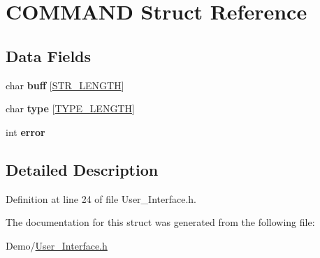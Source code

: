 \hypertarget{struct_c_o_m_m_a_n_d}{}\section{C\+O\+M\+M\+A\+ND Struct Reference}
\label{struct_c_o_m_m_a_n_d}
\subsection*{Data Fields}
\begin{DoxyCompactItemize}
\item 
\mbox{\label{struct_c_o_m_m_a_n_d_a3ca56d05670fa13929584cd8aebae252}} 
char {\bfseries buff} \mbox{[}\hyperlink{_a_p_i___i_o_8h_a9e8aaf9c28f704136d8fc1ba043b6bf5}{S\+T\+R\+\_\+\+L\+E\+N\+G\+TH}\mbox{]}
\item 
\mbox{\label{struct_c_o_m_m_a_n_d_a106c2825d202a4530656fcd385d0c04b}} 
char {\bfseries type} \mbox{[}\hyperlink{_a_p_i___i_o_8h_a7be6924e0d85f3f82149ea31cca36887}{T\+Y\+P\+E\+\_\+\+L\+E\+N\+G\+TH}\mbox{]}
\item 
\mbox{\label{struct_c_o_m_m_a_n_d_a11614f44ef4d939bdd984953346a7572}} 
int {\bfseries error}
\end{DoxyCompactItemize}


\subsection{Detailed Description}


Definition at line 24 of file User\+\_\+\+Interface.\+h.



The documentation for this struct was generated from the following file\+:\begin{DoxyCompactItemize}
\item 
Demo/\hyperlink{_user___interface_8h}{User\+\_\+\+Interface.\+h}\end{DoxyCompactItemize}
